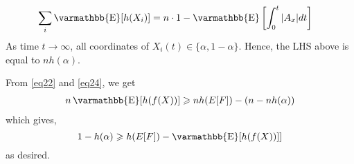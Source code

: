 \documentclass
[12pt,letterpaper]
{article}
\theoremstyle{definition}
\theoremstyle{remark}
\let\mathbb\varmathbb
\newcommand{\Esymb}{\mathbb{E}}
\newcommand{\Psymb}{\mathbb{P}}
\DeclareMathOperator*{\E}{\Esymb}
\DeclareMathOperator*{\ProbOp}{\Psymb}
\renewcommand{\Pr}{\ProbOp}
\newcommand{\cP}{\mathcal P}
\renewcommand{\geq}{\geqslant}
\numberwithin{equation}{section}
\begin{document}
\begin{align}\label{eq22}
\sum_i \E[h(X_i)] & = n \cdot 1 - \E \left[ \int_0^t |A_x| dt \right] 
\end{align}
As time $t \to \infty$, all coordinates of $X_i(t) \in \{\alpha, 1-\alpha\}$.  Hence, the LHS above is equal to $n h(\alpha)$.

From \eqref{eq22} and \eqref{eq24}, we get
\begin{align*}
n \E[h(f(X))] \geq n h(E[F]) - (n - n h(\alpha))
\end{align*}
which gives,
\[ 1-h(\alpha) \geq h(E[F]) - \E[h(f(X))]] \]
as desired.
\fi

\iffalse
At any given time $t$, partition the set of all paths $\cP = \cup_{i = 1}^n \cP_i$ where $\cP_i$ is set of all paths such that $i$ is the lexicographically first active coordinate at the end, i.e., at time $t$, $x_i \notin \{\alpha, 1-\alpha\}$.

(Doing it slowly, since I am on shaky ground)
We can write from \eqref{eq5},
\begin{align} 
\E[h(f(X))] & = h(E[F]) - \frac{1}{2} \E \left[ \int_0^t  (v(X)^T \tilde{S} \tilde{S}^T (v(X)) dt\right] \nonumber \\
			& = h(E[F]) - \frac{1}{2} \sum_i \Pr[\cP_i] \cdot \E \left[ \int_0^t  (v(X)^T \tilde{S} \tilde{S}^T (v(X)) dt | \cP_i \right] \nonumber\\  
			& \geq  h(E[F]) - \frac{1}{2} \sum_i \Pr[\cP_i] \cdot \E \left[ \int_0^t  (\tilde{S} \tilde{S}^T)_{ii} dt | \cP_i \right]   \label{eq7}
\end{align}
where in the last step we used dictator dominance on coordinate $i$ which was active throughout the path.

Now consider the $i$th dictator $x_i$.  We can write,
\begin{align*} 
\E[h(x_i) | \cP_i] & = 1 + \E\left[ \int h'(x_i) (\nabla x_i)^T S dB | \cP_i\right]  - \frac{1}{2} \E \left[ \int_0^t  ( \tilde{S} \tilde{S}^T)_{ii}  dt\right]
\end{align*}
%
Note that even after conditioning on $\cP_i$, the $i$th coordinate given by $dX_i = (e_i)^T S dB$ is a martingale.  So the first term on RHS is equal to zero.  
Secondly, after sufficiently long time, $x_i = \alpha $ or $x_i = 1-\alpha$ along all paths.  Moreover, $h(\alpha) = h(1-\alpha)$.   So the LHS above is equal to $h(\alpha)$.  
Therefore one can immediately conclude that for each $i$, after sufficiently long time,
\begin{align*}
 \frac{1}{2} \E \left[ \int_0^t  ( \tilde{S} \tilde{S}^T)_{ii} dt\right] = 1- h(\alpha)
\end{align*}
Substituting the above in \eqref{eq7}, we get that
\begin{align}
\E[h(f(X))] & \geq  h(E[F]) - (1-h(\alpha))
\end{align}
\fi
\end{document}
